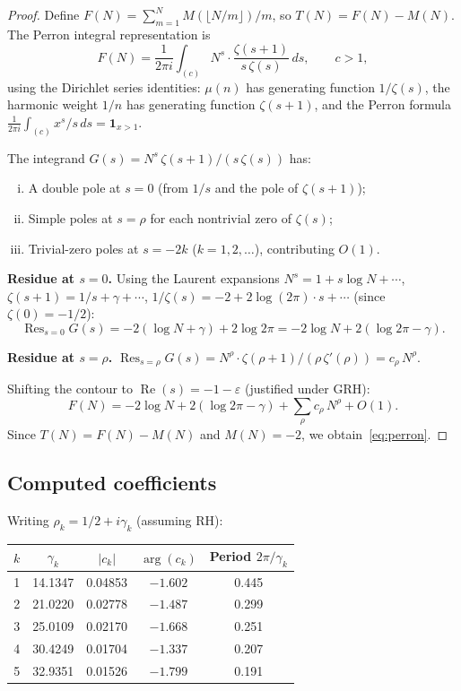 \documentclass[11pt]{article}
\theoremstyle{definition}
\DeclareMathOperator{\Res}{Res}
\begin{document}
\begin{proof}
Define $F(N) = \sum_{m=1}^{N} M(\lfloor N/m \rfloor)/m$, so
$T(N) = F(N) - M(N)$.  The Perron integral representation is
\begin{equation}\label{eq:perron-integral}
  F(N) = \frac{1}{2\pi i} \int_{(c)} N^s \cdot
  \frac{\zeta(s+1)}{s\,\zeta(s)}\,ds, \qquad c > 1,
\end{equation}
using the Dirichlet series identities: $\mu(n)$ has generating
function $1/\zeta(s)$, the harmonic weight $1/n$ has generating
function $\zeta(s+1)$, and the Perron formula
$\frac{1}{2\pi i}\int_{(c)} x^s/s\,ds = \mathbf{1}_{x > 1}$.

The integrand $G(s) = N^s\,\zeta(s+1)/(s\,\zeta(s))$ has:
\begin{enumerate}[(i)]
  \item A double pole at $s = 0$ (from $1/s$ and the pole of
    $\zeta(s+1)$);
  \item Simple poles at $s = \rho$ for each nontrivial zero of
    $\zeta(s)$;
  \item Trivial-zero poles at $s = -2k$ ($k = 1, 2, \ldots$),
    contributing $O(1)$.
\end{enumerate}

\textbf{Residue at $s = 0$.}  Using the Laurent expansions
$N^s = 1 + s\log N + \cdots$,
$\zeta(s+1) = 1/s + \gamma + \cdots$,
$1/\zeta(s) = -2 + 2\log(2\pi)\cdot s + \cdots$
(since $\zeta(0) = -1/2$):
\[
  \Res_{s=0} G(s) = -2(\log N + \gamma) + 2\log 2\pi
  = -2\log N + 2(\log 2\pi - \gamma).
\]

\textbf{Residue at $s = \rho$.}
$\Res_{s=\rho} G(s) = N^\rho \cdot \zeta(\rho+1)/(\rho\,\zeta'(\rho))
= c_\rho\, N^\rho$.

Shifting the contour to $\operatorname{Re}(s) = -1 - \varepsilon$
(justified under GRH):
\[
  F(N) = -2\log N + 2(\log 2\pi - \gamma)
  + \sum_\rho c_\rho\, N^\rho + O(1).
\]
Since $T(N) = F(N) - M(N)$ and $M(N) = -2$, we obtain~\eqref{eq:perron}.
\end{proof}

\subsection{Computed coefficients}

Writing $\rho_k = 1/2 + i\gamma_k$ (assuming RH):

\begin{center}
\begin{tabular}{ccccc}
\toprule
$k$ & $\gamma_k$ & $|c_k|$ & $\arg(c_k)$ & Period $2\pi/\gamma_k$ \\
\midrule
1 & 14.1347 & 0.04853 & $-1.602$ & 0.445 \\
2 & 21.0220 & 0.02778 & $-1.487$ & 0.299 \\
3 & 25.0109 & 0.02170 & $-1.668$ & 0.251 \\
4 & 30.4249 & 0.01704 & $-1.337$ & 0.207 \\
5 & 32.9351 & 0.01526 & $-1.799$ & 0.191 \\
\bottomrule
\end{tabular}
\end{center}
\end{document}
